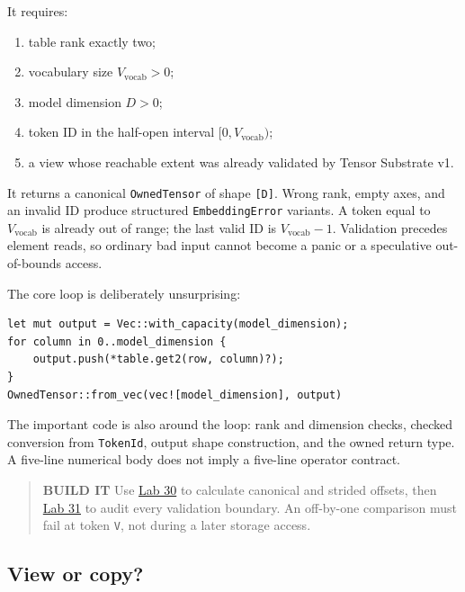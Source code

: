 \documentclass[
  10pt,
]{article}
\providecommand{\tightlist}{%
  \setlength{\itemsep}{0pt}\setlength{\parskip}{0pt}}
\begin{document}

It requires:

\begin{enumerate}
\def\labelenumi{\arabic{enumi}.}
\tightlist
\item
  table rank exactly two;
\item
  vocabulary size \(V_{\mathrm{vocab}}>0\);
\item
  model dimension \(D>0\);
\item
  token ID in the half-open interval \([0,V_{\mathrm{vocab}})\);
\item
  a view whose reachable extent was already validated by Tensor
  Substrate v1.
\end{enumerate}

It returns a canonical \texttt{OwnedTensor} of shape \texttt{{[}D{]}}.
Wrong rank, empty axes, and an invalid ID produce structured
\texttt{EmbeddingError} variants. A token equal to
\(V_{\mathrm{vocab}}\) is already out of range; the last valid ID is
\(V_{\mathrm{vocab}}-1\). Validation precedes element reads, so ordinary
bad input cannot become a panic or a speculative out-of-bounds access.

The core loop is deliberately unsurprising:

\begin{verbatim}
let mut output = Vec::with_capacity(model_dimension);
for column in 0..model_dimension {
    output.push(*table.get2(row, column)?);
}
OwnedTensor::from_vec(vec![model_dimension], output)
\end{verbatim}

The important code is also around the loop: rank and dimension checks,
checked conversion from \texttt{TokenId}, output shape construction, and
the owned return type. A five-line numerical body does not imply a
five-line operator contract.

\begin{quote}
\textbf{BUILD IT} Use
\href{https://github.com/hermonai/inside-the-llm-engine/blob/astra-visual-rewrite/labs/lab-30-inspect-embedding-row.md}{Lab
30} to calculate canonical and strided offsets, then
\href{https://github.com/hermonai/inside-the-llm-engine/blob/astra-visual-rewrite/labs/lab-31-checked-embedding-lookup.md}{Lab
31} to audit every validation boundary. An off-by-one comparison must
fail at token \texttt{V}, not during a later storage access.
\end{quote}

\subsection{View or copy?}\label{view-or-copy}
\end{document}

